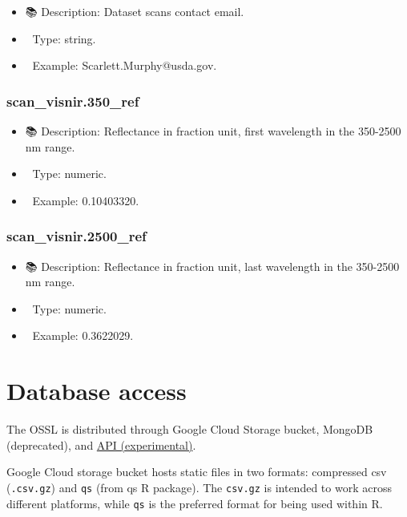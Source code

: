 \documentclass[
  letterpaper,
  DIV=11,
  numbers=noendperiod]{scrreprt}
\providecommand{\tightlist}{%
  \setlength{\itemsep}{0pt}\setlength{\parskip}{0pt}}\usepackage{longtable,booktabs,array}
\begin{document}
\begin{itemize}
\tightlist
\item
  📚 Description: Dataset scans contact email.
\item
  🔢 Type: string.
\item
  📖 Example: Scarlett.Murphy@usda.gov.
\end{itemize}

\subsection{scan\_visnir.350\_ref}\label{scan_visnir.350_ref}

\begin{itemize}
\tightlist
\item
  📚 Description: Reflectance in fraction unit, first wavelength in the
  350-2500 nm range.
\item
  🔢 Type: numeric.
\item
  📖 Example: 0.10403320.
\end{itemize}

\subsection{scan\_visnir.2500\_ref}\label{scan_visnir.2500_ref}

\begin{itemize}
\tightlist
\item
  📚 Description: Reflectance in fraction unit, last wavelength in the
  350-2500 nm range.
\item
  🔢 Type: numeric.
\item
  📖 Example: 0.3622029.
\end{itemize}


\chapter{Database access}\label{sec-db-access}

The OSSL is distributed through Google Cloud Storage bucket, MongoDB
(deprecated), and
\href{https://api.soilspectroscopy.org/__docs__/\#/}{API
(experimental)}.

Google Cloud storage bucket hosts static files in two formats:
compressed csv (\texttt{.csv.gz}) and \texttt{qs} (from qs R package).
The \texttt{csv.gz} is intended to work across different platforms,
while \texttt{qs} is the preferred format for being used within R.
\end{document}

